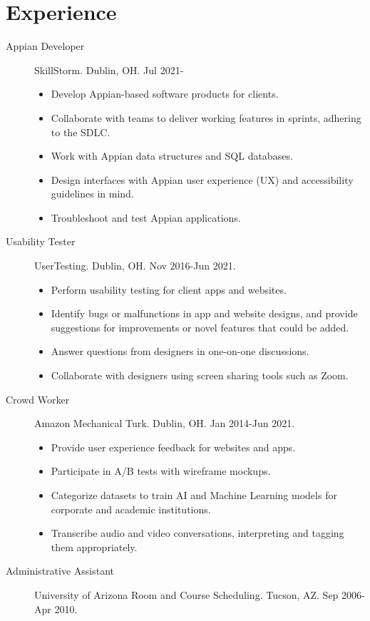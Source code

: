 \documentclass{article}
\begin{document}
\section*{Experience}\vspace{-0.5em}
\begin{description}
  \item[Appian Developer] SkillStorm. Dublin, OH. Jul 2021-
  \begin{itemize}
    \item Develop Appian-based software products for clients.
    \item Collaborate with teams to deliver working features in sprints, adhering to the SDLC.
    \item Work with Appian data structures and SQL databases.
    \item Design interfaces with Appian user experience (UX) and accessibility guidelines in mind.
    \item Troubleshoot and test Appian applications.
  \end{itemize}
  \item[Usability Tester] UserTesting. Dublin, OH. Nov 2016-Jun 2021.
  \begin{itemize}
    \item Perform usability testing for client apps and websites.
    \item Identify bugs or malfunctions in app and website designs, and provide suggestions for improvements or novel features that could be added.
    \item Answer questions from designers in one-on-one discussions.
    \item Collaborate with designers using screen sharing tools such as Zoom.
  \end{itemize}  
  \item[Crowd Worker] Amazon Mechanical Turk. Dublin, OH. Jan 2014-Jun 2021.
  \begin{itemize}
    \item Provide user experience feedback for websites and apps.
    \item Participate in A/B tests with wireframe mockups.
    \item Categorize datasets to train AI and Machine Learning models for corporate and academic institutions.
    \item Transcribe audio and video conversations, interpreting and tagging them appropriately.
  \end{itemize}  
  \item[Administrative Assistant] University of Arizona Room and Course Scheduling. Tucson, AZ. Sep 2006-Apr 2010.

\end{description}
\end{document}
